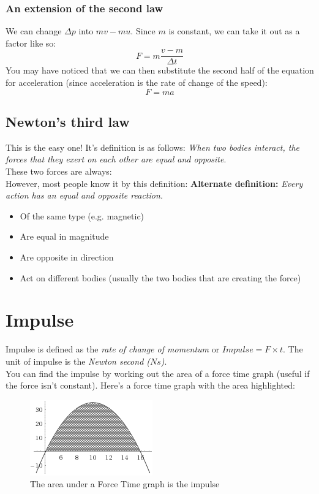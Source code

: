 \documentclass{article}
\begin{document}
\subsubsection*{An extension of the second law}
We can change $\Delta p$ into $mv - mu$. Since $m$ is constant, we can take it out as a factor like so:
\[
	F = m\frac{v - m}{\Delta t}
\]
You may have noticed that we can then substitute the second half of the equation for acceleration (since acceleration is the rate of change of the speed):
\[
	F = ma
\]
\subsection*{Newton's third law}
This is the easy one! It's definition is as follows: \textit{When two bodies interact, the forces that they exert on each other are equal and opposite}.\\
These two forces are always:\\
However, most people know it by this definition:
\textbf{Alternate definition:} \textit{Every action has an equal and opposite reaction.}

\begin{itemize}
	\item Of the same type (e.g. magnetic)
	\item Are equal in magnitude
	\item Are opposite in direction
	\item Act on different bodies (usually the two bodies that are creating the force)
\end{itemize}

\section*{Impulse}
Impulse is defined as the \textit{rate of change of momentum} or $Impulse = F \times t$. The unit of impulse is the \textit{Newton second ($Ns$)}.\\
You can find the impulse by working out the area of a force time graph (useful if the force isn't constant). Here's a force time graph with the area highlighted:
\begin{figure}[htbp]
	\centering
		\includegraphics{graph.png}
	\caption{The area under a Force Time graph is the impulse}
\end{figure}
\end{document}
